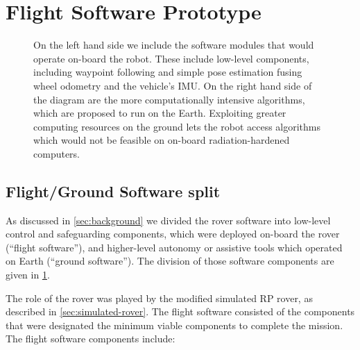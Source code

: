 \documentclass[twocolumn,letterpaper]{IEEEAerospaceCLS}  %
\begin{document}
\section{Flight Software Prototype}

\begin{figure}
\centering
{}
\caption{On the left hand side we include the software modules that would operate on-board the robot.  These include low-level components, including waypoint following and simple pose estimation fusing wheel odometry and the vehicle's IMU.  On the right hand side of the diagram are the more computationally intensive algorithms, which are proposed to run on the Earth.  Exploiting greater computing resources on the ground lets the robot access algorithms which would not be feasible on on-board radiation-hardened computers. \label{fig:rp-software}}
\end{figure}


\subsection{Flight/Ground Software split}

As discussed in \cref{sec:background} we divided the rover software into low-level control and safeguarding components, which were deployed on-board the rover (``flight software''), and higher-level autonomy or assistive tools which operated on Earth (``ground software'').  The division of those software components are given in \cref{fig:rp-software}.   

The role of the rover was played by the modified simulated RP rover, as described in \cref{sec:simulated-rover}.  The flight software consisted of the components that were designated the minimum viable components to complete the mission.  The flight software components include:
\end{document}
